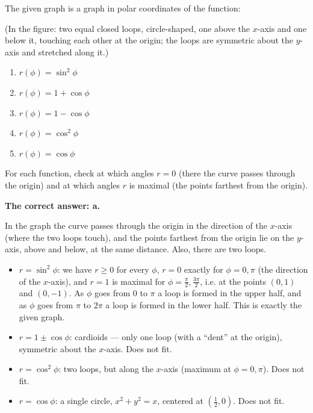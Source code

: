 
\begin{question}
The given graph is a graph in polar coordinates of the function:

(In the figure: two equal closed loops, circle-shaped, one above the $x$-axis and one below it, touching each other at the origin; the loops are symmetric about the $y$-axis and stretched along it.)
\begin{enumerate}
  \item $r(\phi)=\sin^2\phi$
  \item $r(\phi)=1+\cos\phi$
  \item $r(\phi)=1-\cos\phi$
  \item $r(\phi)=\cos^2\phi$
  \item $r(\phi)=\cos\phi$
\end{enumerate}
\end{question}

\begin{hint}
For each function, check at which angles $r=0$ (there the curve passes through the origin) and at which angles $r$ is maximal (the points farthest from the origin).
\end{hint}

\begin{solution}
\textbf{The correct answer: a.}

In the graph the curve passes through the origin in the direction of the $x$-axis (where the two loops touch), and the points farthest from the origin lie on the $y$-axis, above and below, at the same distance. Also, there are two loops.

\begin{itemize}
  \item $r=\sin^2\phi$: we have $r\ge0$ for every $\phi$, $r=0$ exactly for $\phi=0,\pi$ (the direction of the $x$-axis), and $r=1$ is maximal for $\phi=\frac{\pi}{2},\frac{3\pi}{2}$, i.e. at the points $(0,1)$ and $(0,-1)$. As $\phi$ goes from $0$ to $\pi$ a loop is formed in the upper half, and as $\phi$ goes from $\pi$ to $2\pi$ a loop is formed in the lower half. This is exactly the given graph.
  \item $r=1\pm\cos\phi$: cardioids --- only one loop (with a ``dent'' at the origin), symmetric about the $x$-axis. Does not fit.
  \item $r=\cos^2\phi$: two loops, but along the $x$-axis (maximum at $\phi=0,\pi$). Does not fit.
  \item $r=\cos\phi$: a single circle, $x^2+y^2=x$, centered at $(\frac12,0)$. Does not fit.
\end{itemize}
\end{solution}

